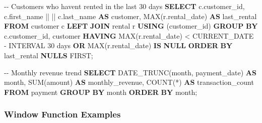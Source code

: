 \documentclass[
  letterpaper,
  DIV=11,
  numbers=noendperiod]{scrartcl}
\newenvironment{Shaded}{\begin{snugshade}}{\end{snugshade}}
\newcommand{\CommentTok}[1]{\textcolor[rgb]{0.37,0.37,0.37}{#1}}
\newcommand{\DataTypeTok}[1]{\textcolor[rgb]{0.68,0.00,0.00}{#1}}
\newcommand{\FunctionTok}[1]{\textcolor[rgb]{0.28,0.35,0.67}{#1}}
\newcommand{\KeywordTok}[1]{\textcolor[rgb]{0.00,0.23,0.31}{\textbf{#1}}}
\newcommand{\NormalTok}[1]{\textcolor[rgb]{0.00,0.23,0.31}{#1}}
\newcommand{\OperatorTok}[1]{\textcolor[rgb]{0.37,0.37,0.37}{#1}}
\newcommand{\StringTok}[1]{\textcolor[rgb]{0.13,0.47,0.30}{#1}}
\begin{document}
\begin{Shaded}
\begin{Highlighting}[]
\CommentTok{{-}{-} Customers who haven\textquotesingle{}t rented in the last 30 days}
\KeywordTok{SELECT}\NormalTok{ c.customer\_id,}
\NormalTok{       c.first\_name }\OperatorTok{||} \StringTok{\textquotesingle{} \textquotesingle{}} \OperatorTok{||}\NormalTok{ c.last\_name }\KeywordTok{AS}\NormalTok{ customer,}
       \FunctionTok{MAX}\NormalTok{(r.rental\_date) }\KeywordTok{AS}\NormalTok{ last\_rental}
\KeywordTok{FROM}\NormalTok{ customer c}
\KeywordTok{LEFT} \KeywordTok{JOIN}\NormalTok{ rental r }\KeywordTok{USING}\NormalTok{ (customer\_id)}
\KeywordTok{GROUP} \KeywordTok{BY}\NormalTok{ c.customer\_id, customer}
\KeywordTok{HAVING} \FunctionTok{MAX}\NormalTok{(r.rental\_date) }\OperatorTok{\textless{}} \FunctionTok{CURRENT\_DATE} \OperatorTok{{-}} \DataTypeTok{INTERVAL} \StringTok{\textquotesingle{}30 days\textquotesingle{}}
   \KeywordTok{OR} \FunctionTok{MAX}\NormalTok{(r.rental\_date) }\KeywordTok{IS} \KeywordTok{NULL}
\KeywordTok{ORDER} \KeywordTok{BY}\NormalTok{ last\_rental }\KeywordTok{NULLS} \FunctionTok{FIRST}\NormalTok{;}

\CommentTok{{-}{-} Monthly revenue trend}
\KeywordTok{SELECT}\NormalTok{ DATE\_TRUNC(}\StringTok{\textquotesingle{}month\textquotesingle{}}\NormalTok{, payment\_date) }\KeywordTok{AS} \DataTypeTok{month}\NormalTok{,}
       \FunctionTok{SUM}\NormalTok{(amount) }\KeywordTok{AS}\NormalTok{ monthly\_revenue,}
       \FunctionTok{COUNT}\NormalTok{(}\OperatorTok{*}\NormalTok{) }\KeywordTok{AS}\NormalTok{ transaction\_count}
\KeywordTok{FROM}\NormalTok{ payment}
\KeywordTok{GROUP} \KeywordTok{BY} \DataTypeTok{month}
\KeywordTok{ORDER} \KeywordTok{BY} \DataTypeTok{month}\NormalTok{;}
\end{Highlighting}
\end{Shaded}

\subsubsection{Window Function Examples}\label{window-function-examples}
\end{document}
